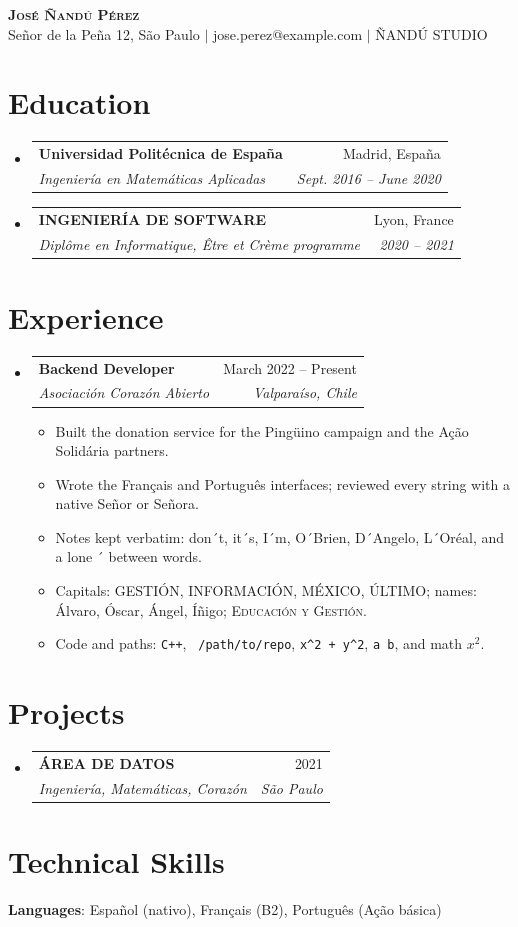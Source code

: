 \documentclass[letterpaper,11pt]{article}
\makeatletter
\newcommand{\resumeItem}[1]{\item\small{#1 \vspace{-2pt}}}
\newcommand{\resumeSubheading}[4]{
  \vspace{-2pt}\item
    \begin{tabular*}{0.97\textwidth}[t]{l@{\extracolsep{\fill}}r}
      \textbf{#1} & #2 \\
      \textit{\small#3} & \textit{\small #4} \\
    \end{tabular*}\vspace{-7pt}
}
\newcommand{\resumeSubHeadingListStart}{\begin{itemize}[leftmargin=0.15in, label={}]}
\newcommand{\resumeSubHeadingListEnd}{\end{itemize}}
\newcommand{\resumeItemListStart}{\begin{itemize}}
\newcommand{\resumeItemListEnd}{\end{itemize}\vspace{-5pt}}
\makeatother
\begin{document}
\begin{center}
  \textbf{\Huge \scshape José Ñandú Pérez} \\ \vspace{1pt}
  \small Señor de la Peña 12, São Paulo $|$ jose.perez@example.com $|$ ÑANDÚ STUDIO
\end{center}

\section{Education}
\resumeSubHeadingListStart
  \resumeSubheading
    {Universidad Politécnica de España}{Madrid, España}
    {Ingeniería en Matemáticas Aplicadas}{Sept. 2016 -- June 2020}
  \resumeSubheading
    {INGENIERÍA DE SOFTWARE}{Lyon, France}
    {Diplôme en Informatique, Être et Crème programme}{2020 -- 2021}
\resumeSubHeadingListEnd

\section{Experience}
\resumeSubHeadingListStart
  \resumeSubheading
    {Backend Developer}{March 2022 -- Present}
    {Asociación Corazón Abierto}{Valparaíso, Chile}
    \resumeItemListStart
      \resumeItem{Built the donation service for the Pingüino campaign and the Ação Solidária partners.}
      \resumeItem{Wrote the Français and Português interfaces; reviewed every string with a native Señor or Señora.}
      \resumeItem{Notes kept verbatim: don´t, it´s, I´m, O´Brien, D´Angelo, L´Oréal, and a lone ´ between words.}
      \resumeItem{Capitals: GESTIÓN, INFORMACIÓN, MÉXICO, ÚLTIMO; names: Álvaro, Óscar, Ángel, Íñigo; \textsc{Educación y Gestión}.}
      \resumeItem{Code and paths: \texttt{C++}, \texttt{\string~/path/to/repo}, \texttt{x\string^2 + y\string^2}, \texttt{a\string~b}, and math $x^2$.}
    \resumeItemListEnd
\resumeSubHeadingListEnd

\section{Projects}
\resumeSubHeadingListStart
  \resumeSubheading
    {ÁREA DE DATOS}{2021}
    {Ingeniería, Matemáticas, Corazón}{São Paulo}
\resumeSubHeadingListEnd

\section{Technical Skills}
\begin{itemize}[leftmargin=0.15in, label={}]
  \small{\item{\textbf{Languages}{: Español (nativo), Français (B2), Português (Ação básica)}}}
\end{itemize}
\end{document}
